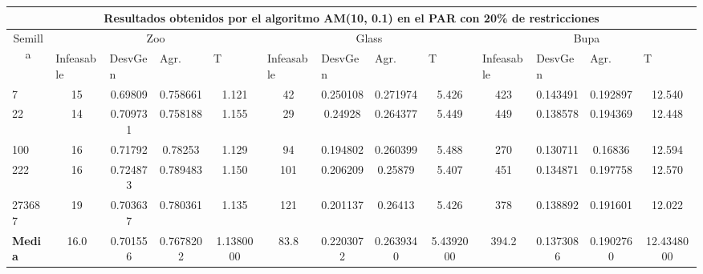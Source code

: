 \begin{table}[H]
	\tiny

	\begin{adjustwidth}{-1cm}{-1cm}%
	
	\begin{tabular}{|l|c|c|c|c|c|c|c|c|c|c|c|c|}
	\hline
	\multicolumn{13}{|c|}{\textbf{Resultados obtenidos por el algoritmo AM(10, 0.1) en el PAR con 20\% de restricciones}}                                                                                                                                                                                                                                                                                                                                            \\ \hline
	\multicolumn{1}{|c|}{\multirow{2}{*}{Semilla}} & \multicolumn{4}{c|}{Zoo}                                                                                          & \multicolumn{4}{c|}{Glass}                                                                                         & \multicolumn{4}{c|}{Bupa}                                                                                          \\ \cline{2-13} 
	\multicolumn{1}{|c|}{}                                  & \multicolumn{1}{l|}{Infeasable} & \multicolumn{1}{l|}{DesvGen} & \multicolumn{1}{l|}{Agr.} & \multicolumn{1}{l|}{T} & \multicolumn{1}{l|}{Infeasable} & \multicolumn{1}{l|}{DesvGen} & \multicolumn{1}{l|}{Agr.} & \multicolumn{1}{l|}{T} & \multicolumn{1}{l|}{Infeasable} & \multicolumn{1}{l|}{DesvGen} & \multicolumn{1}{l|}{Agr.} & \multicolumn{1}{l|}{T} \\ \hline
	7   	& 15 & 0.69809 & 0.758661 & 1.121 &				42 & 0.250108 & 0.271974 & 5.426 &			 	423 & 0.143491 & 0.192897 & 12.540		\\ \hline
	22 		& 14 & 0.709731 & 0.758188 & 1.155 &				29 & 0.24928 & 0.264377 & 5.449 &		 	449 & 0.138578 & 0.194369 & 12.448		\\ \hline
	100 	& 16 & 0.71792 & 0.78253 & 1.129 &				94 & 0.194802 & 0.260399 & 5.488 &				270 & 0.130711 & 0.16836 & 12.594		\\ \hline
	222 	& 16 & 0.724873 & 0.789483 & 1.150 &				101 & 0.206209 & 0.25879 & 5.407 & 			451 & 0.134871 & 0.197758 & 12.570			\\ \hline
	273687 	& 19 & 0.703637 & 0.780361 & 1.135 &				121 & 0.201137 & 0.26413 & 5.426 &			378 & 0.138892 & 0.191601 & 12.022		\\ \hline
	\textbf{Media} &  16.0 & 	0.701556	 & 0.7678202	 & 1.1380000	 & 83.8 & 	0.2203072 & 	0.2639340 & 	5.4392000 & 	394.2	 & 0.1373086 & 	0.1902760 & 	12.4348000  \\ \hline
	\end{tabular}
	
	\end{adjustwidth}
	
\end{table}

